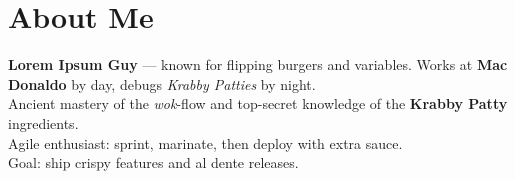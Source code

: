 \section{About Me}
\resumeSubHeadingListStart
\item \small{
  \textbf{Lorem Ipsum Guy} — known for flipping burgers and variables. Works at \textbf{Mac Donaldo} by day, debugs \textit{Krabby Patties} by night.  \\
  Ancient mastery of the \textit{wok}-flow and top-secret knowledge of the \textbf{Krabby Patty} ingredients.  \\
  Agile enthusiast: sprint, marinate, then deploy with extra sauce.  \\
  Goal: ship crispy features and al dente releases.
}
\resumeSubHeadingListEnd
